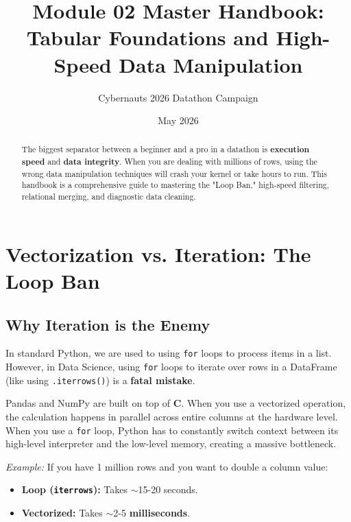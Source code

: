 \documentclass{article}
\title{Module 02 Master Handbook: Tabular Foundations and High-Speed Data Manipulation}
\author{Cybernauts 2026 Datathon Campaign}
\date{May 2026}
\begin{document}
\maketitle

\begin{abstract}
The biggest separator between a beginner and a pro in a datathon is \textbf{execution speed} and \textbf{data integrity}. When you are dealing with millions of rows, using the wrong data manipulation techniques will crash your kernel or take hours to run. This handbook is a comprehensive guide to mastering the "Loop Ban," high-speed filtering, relational merging, and diagnostic data cleaning.
\end{abstract}

\tableofcontents
\newpage

\section{Vectorization vs. Iteration: The Loop Ban}

\subsection{Why Iteration is the Enemy}
In standard Python, we are used to using \texttt{for} loops to process items in a list. However, in Data Science, using \texttt{for} loops to iterate over rows in a DataFrame (like using \texttt{.iterrows()}) is a \textbf{fatal mistake}.

\begin{tcolorbox}[colback=red!5!white,colframe=red!75!black,title=The Performance Gap]
Pandas and NumPy are built on top of \textbf{C}. When you use a vectorized operation, the calculation happens in parallel across entire columns at the hardware level. When you use a \texttt{for} loop, Python has to constantly switch context between its high-level interpreter and the low-level memory, creating a massive bottleneck.
\end{tcolorbox}

\textit{Example:} If you have 1 million rows and you want to double a column value:
\begin{itemize}
    \item \textbf{Loop (\texttt{iterrows}):} Takes $\sim$15-20 seconds.
    \item \textbf{Vectorized:} Takes $\sim$2-5 \textbf{milliseconds}.
\end{itemize}
\end{document}
